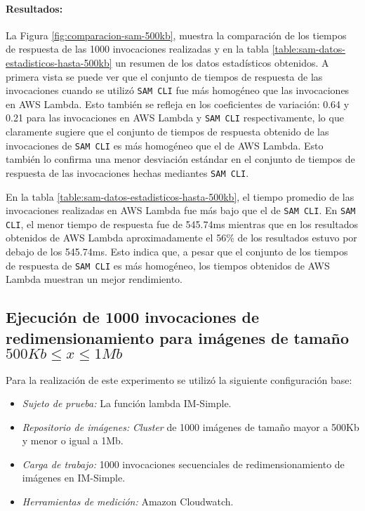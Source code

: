 \paragraph{Resultados:} La Figura \ref{fig:comparacion-sam-500kb}, muestra la comparación de los tiempos de respuesta de las 1000 invocaciones realizadas y en la tabla \ref{table:sam-datos-estadisticos-hasta-500kb} un resumen de los datos estadísticos obtenidos. A primera vista se puede ver que el conjunto de tiempos de respuesta de las invocaciones cuando se utilizó \texttt{SAM CLI} fue más homogéneo que las invocaciones en AWS Lambda. Esto también se refleja en los coeficientes de variación: 0.64 y 0.21 para las invocaciones en AWS Lambda y \texttt{SAM CLI} respectivamente, lo que claramente sugiere que el conjunto de tiempos de respuesta obtenido de las invocaciones de \texttt{SAM CLI} es más homogéneo que el de AWS Lambda. Esto también lo confirma una menor desviación estándar en el conjunto de tiempos de respuesta de las invocaciones hechas mediantes \texttt{SAM CLI}. 

En la tabla \ref{table:sam-datos-estadisticos-hasta-500kb}, el tiempo promedio de las invocaciones realizadas en AWS Lambda fue más bajo que el de \texttt{SAM CLI}. En \texttt{SAM CLI}, el menor tiempo de respuesta fue de 545.74ms mientras que en los resultados obtenidos de AWS Lambda aproximadamente el 56\% de los resultados estuvo por debajo de los 545.74ms. Esto indica que, a pesar que el conjunto de los tiempos de respuesta de \texttt{SAM CLI} es más homogéneo, los tiempos obtenidos de AWS Lambda muestran un mejor rendimiento.

\subsection{Ejecución de 1000 invocaciones de redimensionamiento para imágenes de tamaño $500Kb \leq x \leq 1Mb$}

Para la realización de este experimento se utilizó la siguiente configuración base:
\begin{itemize}
    \item \emph{Sujeto de prueba:} La función lambda IM-Simple.
    \item \emph{Repositorio de imágenes:} \emph{Cluster} de 1000 imágenes de tamaño mayor a 500Kb y menor o igual a 1Mb.
    \item \emph{Carga de trabajo:} 1000 invocaciones secuenciales de redimensionamiento de imágenes en IM-Simple.
    \item \emph{Herramientas de medición:} Amazon Cloudwatch.
\end{itemize}

